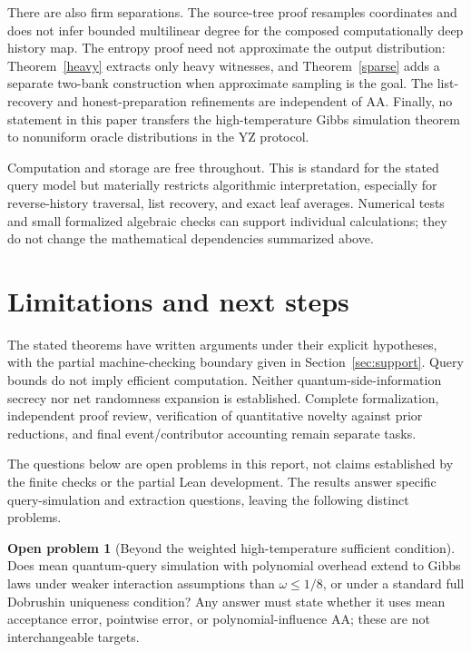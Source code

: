 \documentclass[11pt]{article}
\theoremstyle{definition}\newtheorem{definition}[theorem]{Definition}
\newtheorem{problem}[theorem]{Open problem}
\theoremstyle{remark}\newtheorem{remark}[theorem]{Remark}
\begin{document}
There are also firm separations. The source-tree proof resamples coordinates and does not infer bounded multilinear degree for the composed computationally deep history map. The entropy proof need not approximate the output distribution: Theorem~\ref{heavy} extracts only heavy witnesses, and Theorem~\ref{sparse} adds a separate two-bank construction when approximate sampling is the goal. The list-recovery and honest-preparation refinements are independent of AA. Finally, no statement in this paper transfers the high-temperature Gibbs simulation theorem to nonuniform oracle distributions in the YZ protocol.

Computation and storage are free throughout. This is standard for the stated query model but materially restricts algorithmic interpretation, especially for reverse-history traversal, list recovery, and exact leaf averages. Numerical tests and small formalized algebraic checks can support individual calculations; they do not change the mathematical dependencies summarized above.

\section{Limitations and next steps}\label{sec:open}
The stated theorems have written arguments under their explicit hypotheses, with the partial machine-checking boundary given in Section~\ref{sec:support}. Query bounds do not imply efficient computation. Neither quantum-side-information secrecy nor net randomness expansion is established. Complete formalization, independent proof review, verification of quantitative novelty against prior reductions, and final event/contributor accounting remain separate tasks.

The questions below are open problems in this report, not claims established by the finite checks or the partial Lean development.
The results answer specific query-simulation and extraction questions, leaving the following distinct problems.

\begin{problem}[Beyond the weighted high-temperature sufficient condition]
Does mean quantum-query simulation with polynomial overhead extend to Gibbs laws under weaker interaction assumptions than \(\omega\le1/8\), or under a standard full Dobrushin uniqueness condition? Any answer must state whether it uses mean acceptance error, pointwise error, or polynomial-influence AA; these are not interchangeable targets.
\end{problem}
\end{document}
